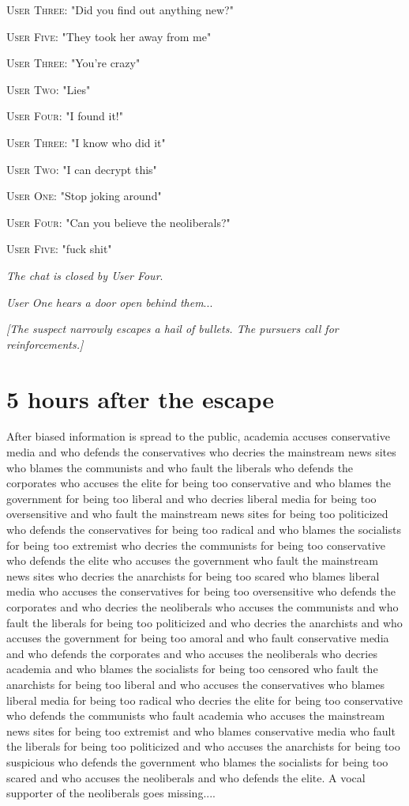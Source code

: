 \documentclass{report}
\begin{document}
\textsc{User Three}: "Did you find out anything new?" 

\textsc{User Five}: "They took her away from me" 

\textsc{User Three}: "You're crazy" 

\textsc{User Two}: "Lies" 

\textsc{User Four}: "I found it!" 

\textsc{User Three}: "I know who did it" 

\textsc{User Two}: "I can decrypt this" 

\textsc{User One}: "Stop joking around" 

\textsc{User Four}: "Can you believe the neoliberals?" 

\textsc{User Five}: "fuck shit" 

\textit{The chat is closed by User Four}. 

\textit{User One hears a door open behind them}...

\textit{[The suspect narrowly escapes a hail of bullets. The pursuers call for reinforcements.]}


\section*{5 \small{hours after the escape}}

After biased information is spread to the public, academia accuses conservative media and who defends the conservatives who decries the mainstream news sites who blames the communists and who fault the liberals who defends the corporates who accuses the elite for being too conservative and who blames the government for being too liberal and who decries liberal media for being too oversensitive and who fault the mainstream news sites for being too politicized who defends the conservatives for being too radical and who blames the socialists for being too extremist who decries the communists for being too conservative who defends the elite who accuses the government who fault the mainstream news sites who decries the anarchists for being too scared who blames liberal media who accuses the conservatives for being too oversensitive who defends the corporates and who decries the neoliberals who accuses the communists and who fault the liberals for being too politicized and who decries the anarchists and who accuses the government for being too amoral and who fault conservative media and who defends the corporates and who accuses the neoliberals who decries academia and who blames the socialists for being too censored who fault the anarchists for being too liberal and who accuses the conservatives who blames liberal media for being too radical who decries the elite for being too conservative who defends the communists who fault academia who accuses the mainstream news sites for being too extremist and who blames conservative media who fault the liberals for being too politicized and who accuses the anarchists for being too suspicious who defends the government who blames the socialists for being too scared and who accuses the neoliberals and who defends the elite. A vocal supporter of the neoliberals goes missing....
\end{document}
